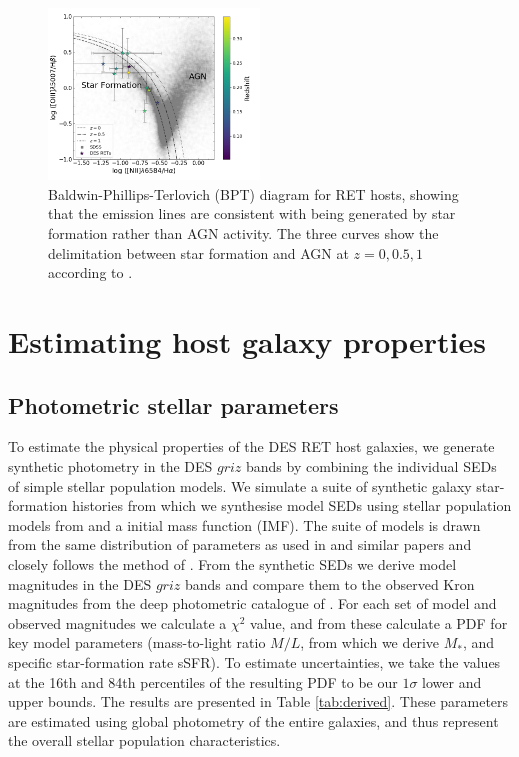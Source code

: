 \documentclass[fleqn,usenatbib,]{mnras}
\newcommand{\replylluis}[1]{\color{green}#1 \color{black}}
\begin{document}
\begin{figure}
\includegraphics[width=0.5\textwidth]{figs/RET_BPT.png}
\caption{Baldwin-Phillips-Terlovich (BPT) diagram for RET hosts, showing that the emission lines are consistent with being generated by star formation rather than AGN activity. The three curves show the delimitation between star formation and AGN at $z =0, 0.5, 1$ according to \citet{Kewley2013}.
\label{fig:bpt}}
\end{figure}

\section{Estimating host galaxy properties}
\label{sec:measure}
\subsection{Photometric stellar parameters \label{subsec:sedfit}}
To estimate the physical properties of the DES RET host galaxies, we generate synthetic photometry in the DES $griz$ bands by combining the individual SEDs of simple stellar population models. We simulate a suite of synthetic galaxy star-formation histories from which we synthesise model SEDs using stellar population models from \citet{Bruzual2003}  and a \citet{Chabrier2003} initial mass function (IMF).  The suite of models is drawn from the same distribution of parameters as used in \citet{Kauffmann2003} and similar papers \citep[e.g.][]{Gallazzi2005,Gallazzi2009} and closely follows the method of \citet{Childress2013}. From the synthetic SEDs we derive model magnitudes in the DES $griz$ bands and compare them to the observed \replylluis{Kron} magnitudes \replylluis{from the deep photometric catalogue of \citet{Wiseman2020}}. For each set of model and observed magnitudes we calculate a $\chi^2$ value, and from these calculate a PDF for key model parameters (mass-to-light ratio $M/L$, from which we derive $M_*$, and specific star-formation rate sSFR). To estimate uncertainties, we take the values at the 16th and 84th percentiles of the resulting PDF to be our $1\sigma$ lower and upper bounds. The results are presented in Table \ref{tab:derived}. \replylluis{These parameters are estimated using global photometry of the entire galaxies, and thus represent the overall stellar population characteristics.}
\end{document}
